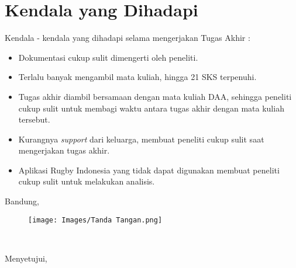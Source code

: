 \documentclass[a4paper,twoside]{article}
\begin{document}
\section{Kendala yang Dihadapi}
Kendala - kendala yang dihadapi selama mengerjakan Tugas Akhir :
\begin{itemize}
	\item Dokumentasi cukup sulit dimengerti oleh peneliti.
	\item Terlalu banyak mengambil mata kuliah, hingga 21 SKS terpenuhi.
	\item Tugas akhir diambil bersamaan dengan mata kuliah DAA, sehingga peneliti cukup sulit untuk membagi waktu antara tugas akhir dengan mata kuliah tersebut.
	\item Kurangnya \textit{support} dari keluarga, membuat peneliti cukup sulit saat mengerjakan tugas akhir.
        \item Aplikasi Rugby Indonesia yang tidak dapat digunakan membuat peneliti cukup sulit untuk melakukan analisis.
\end{itemize}

\vspace{1cm}
\centering Bandung, \tanggal\\
\begin{figure}[!h]
    \centering
    \texttt{[image: Images/Tanda Tangan.png]}
\end{figure}
\nama \\ 
\vspace{1cm}

Menyetujui, \\
\end{document}
